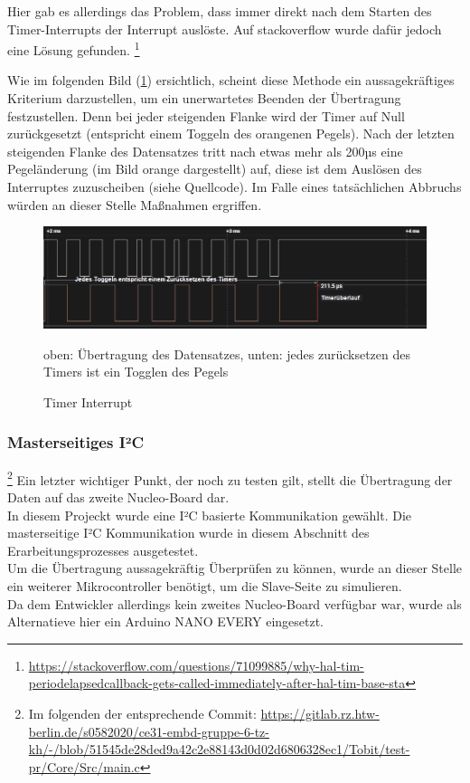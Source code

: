 \documentclass[11pt,a4paper,titlepage]{article}
\begin{document}
Hier gab es allerdings das Problem, dass immer direkt nach dem Starten des Timer-Interrupts der Interrupt auslöste.
Auf stackoverflow wurde dafür jedoch eine Lösung gefunden.
\footnote{\url{https://stackoverflow.com/questions/71099885/why-hal-tim-periodelapsedcallback-gets-called-immediately-after-hal-tim-base-sta}}

Wie im folgenden Bild (\cref{fig:tim_int}) ersichtlich, scheint diese Methode ein aussagekräftiges Kriterium darzustellen,
um ein unerwartetes Beenden der Übertragung festzustellen.
Denn bei jeder steigenden Flanke wird der Timer auf Null zurückgesetzt (entspricht einem Toggeln des orangenen Pegels).
Nach der letzten steigenden Flanke des Datensatzes tritt nach etwas mehr als 200µs eine Pegeländerung (im Bild orange dargestellt) auf,
diese ist dem Auslösen des Interruptes zuzuscheiben (siehe Quellcode).
Im Falle eines tatsächlichen Abbruchs würden an dieser Stelle Maßnahmen ergriffen.

\begin{figure}[H]
    \centering
    \includegraphics[width=\textwidth]{./Bilder-Tobit/timer_interrupt_1.PNG}
    \caption{Timer Interrupt}
    {\small oben: Übertragung des Datensatzes, unten: jedes zurücksetzen des Timers ist ein Togglen des Pegels}
    \label{fig:tim_int}
\end{figure}

\subsubsection{Masterseitiges I²C}
\footnote{Im folgenden der entsprechende Commit: \url{https://gitlab.rz.htw-berlin.de/s0582020/ce31-embd-gruppe-6-tz-kh/-/blob/51545de28ded9a42c2e88143d0d02d6806328ec1/Tobit/test-pr/Core/Src/main.c}}
Ein letzter wichtiger Punkt, der noch zu testen gilt, stellt die Übertragung der Daten auf das zweite Nucleo-Board dar.\\
In diesem Projeckt wurde eine I²C basierte Kommunikation gewählt.
Die masterseitige I²C Kommunikation wurde in diesem Abschnitt des Erarbeitungsprozesses ausgetestet.\\

Um die Übertragung aussagekräftig Überprüfen zu können,
wurde an dieser Stelle ein weiterer Mikrocontroller benötigt, um die Slave-Seite zu simulieren.\\
Da dem Entwickler allerdings kein zweites Nucleo-Board verfügbar war,
wurde als Alternatieve hier ein Arduino NANO EVERY eingesetzt.\\
\end{document}
